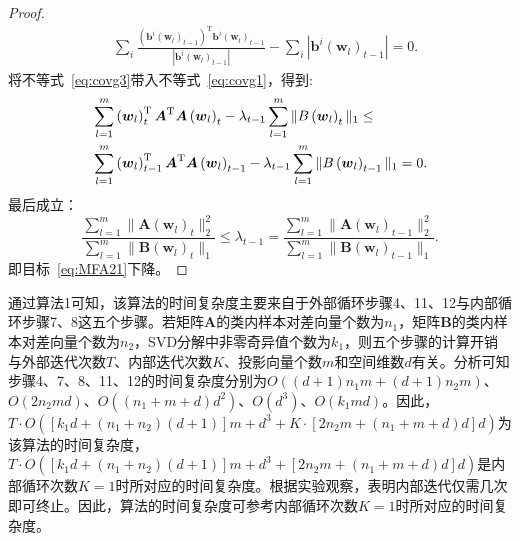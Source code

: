 \begin{proof}
\begin{align}
    &\displaystyle \sum_{i} \frac{\left(\boldsymbol{b}^i\left(\boldsymbol{w}_l\right)_{t-1}\right)^\mathrm{T}\boldsymbol{b}^i\left(\boldsymbol{w}_l\right)_{t-1}}{|\boldsymbol{b}^i\left(\boldsymbol{w}_l\right)_{t-1}|}-\displaystyle \sum_{i} |\boldsymbol{b}^i\left(\boldsymbol{w}_l\right)_{t-1}|=0.
  \end{align}
将不等式~\eqref{eq:covg3}带入不等式~\eqref{eq:covg1}，得到:
  \begin{align}\label{eq:covg4}
    &\displaystyle \sum_{l=1}^m \left(\boldsymbol{w}_l\right)_{t}^\mathrm{T}\boldsymbol{A}^\mathrm{T}\boldsymbol{A}\left(\boldsymbol{w}_l\right)_{t}-\lambda_{t-1}\displaystyle \sum_{l=1}^m \| B\left(\boldsymbol{w}_l\right)_{t}\|_1\leq \notag\\
    &\displaystyle \sum_{l=1}^m \left(\boldsymbol{w}_l\right)_{t-1}^\mathrm{T}\boldsymbol{A}^\mathrm{T}\boldsymbol{A}\left(\boldsymbol{w}_l\right)_{t-1}-\lambda_{t-1}\displaystyle \sum_{l=1}^m \| B\left(\boldsymbol{w}_l\right)_{t-1}\|_1=0.
  \end{align}
最后成立：
 \begin{equation}\label{eq:covg5}
    \frac{\displaystyle \sum_{l=1}^m \|\boldsymbol{A}\left(\boldsymbol{w}_l\right)_{t}\|_{2}^{2}}{\displaystyle \sum_{l=1}^m \|\boldsymbol{B}\left(\boldsymbol{w}_l\right)_{t}\|_1}\leq \lambda_{t-1}=\frac{\displaystyle \sum_{l=1}^m \|\boldsymbol{A}\left(\boldsymbol{w}_l\right)_{t-1}\|_{2}^{2}}{\displaystyle \sum_{l=1}^m \|\boldsymbol{B}\left(\boldsymbol{w}_l\right)_{t-1}\|_1}.
  \end{equation}
即目标~\eqref{eq:MFA21}下降。
\end{proof}

通过算法1可知，该算法的时间复杂度主要来自于外部循环步骤4、11、12与内部循环步骤7、8这五个步骤。若矩阵$\boldsymbol{A}$的类内样本对差向量个数为$n_1$，矩阵$\boldsymbol{B}$的类内样本对差向量个数为$n_2$，SVD分解中非零奇异值个数为$k_1$，则五个步骤的计算开销与外部迭代次数$T$、内部迭代次数$K$、投影向量个数$m$和空间维数$d$有关。分析可知步骤4、7、8、11、12的时间复杂度分别为$O\left((d+1)n_1m+(d+1)n_2m\right)$、$O\left(2n_2md\right)$、$O\left((n_1+m+d)d^2\right)$、$O\left(d^3\right)$、$O\left(k_1md\right)$。因此，$T \cdot O\left(\left[ k_1d+(n_1+n_2)(d+1)\right] m+d^3+ K  \cdot \left[ 2n_2m+(n_1+m+d)d \right]d  \right)$为该算法的时间复杂度，$T \cdot O\left(\left[ k_1d+(n_1+n_2)(d+1)\right] m+d^3+ \left[ 2n_2m+(n_1+m+d)d \right] d  \right)$是内部循环次数$K=1$时所对应的时间复杂度。根据实验观察，表明内部迭代仅需几次即可终止。因此，算法的时间复杂度可参考内部循环次数$K=1$时所对应的时间复杂度。

